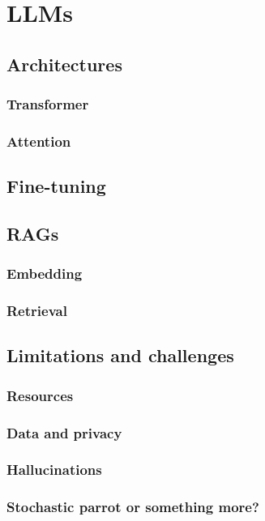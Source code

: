 
\chapter{\Aclp{LLM}}
\label{ch:llm}

\section{Architectures}\label{sec:llm-architectures}

\subsection{Transformer}\label{subsec:transformer}

\subsection{Attention}\label{subsec:attention}

\section{Fine-tuning}\label{sec:llm-fine-tuning}

\section{\Acp{RAG}}\label{sec:rag}

\subsection{Embedding}\label{subsec:rag-embedding}

\subsection{Retrieval}\label{subsec:retrieval}

\section{Limitations and challenges}\label{sec:limitations-and-challenges}

\subsection{Resources}\label{subsec:resources}

\subsection{Data and privacy}\label{subsec:data-and-privacy}

\subsection{Hallucinations}\label{subsec:hallucinations}

\subsection{Stochastic parrot or something more?}\label{subsec:stochastic-parrot-or-something-more}